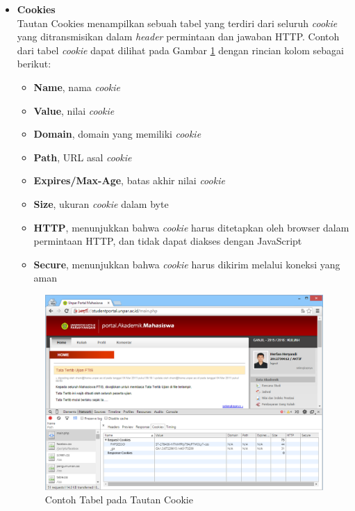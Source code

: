 \begin{itemize}
	\item \textbf{Cookies}\\
	Tautan Cookies menampilkan sebuah tabel yang terdiri dari seluruh \textit{cookie} yang ditransmisikan dalam \textit{header} permintaan dan jawaban HTTP. Contoh dari tabel \textit{cookie} dapat dilihat pada Gambar \ref{fig:2_network_cookies} dengan rincian kolom sebagai berikut:
	\begin{itemize}
		\item \textbf{Name}, nama \textit{cookie}
		\item \textbf{Value}, nilai \textit{cookie}
		\item \textbf{Domain}, domain yang memiliki \textit{cookie}
		\item \textbf{Path}, URL asal \textit{cookie}
		\item \textbf{Expires/Max-Age}, batas akhir nilai \textit{cookie}
		\item \textbf{Size}, ukuran \textit{cookie} dalam byte
		\item \textbf{HTTP}, menunjukkan bahwa \textit{cookie} harus ditetapkan oleh browser dalam permintaan HTTP, dan tidak dapat diakses dengan JavaScript
		\item \textbf{Secure}, menunjukkan bahwa \textit{cookie} harus dikirim melalui koneksi yang aman
	\end{itemize}
	
\begin{figure}[H]
	\centering
	\includegraphics[scale=0.5]{Gambar/network-cookies}
	\caption{Contoh Tabel pada Tautan Cookie} 
	\label{fig:2_network_cookies}
\end{figure}

\end{itemize}

